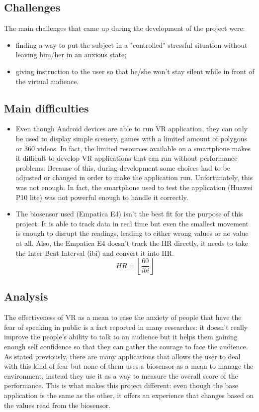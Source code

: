 \subsection{Challenges}
The main challenges that came up during the development of the project were:
\begin{itemize}
	\item finding a way to put the subject in a "controlled" stressful situation without leaving him/her in an anxious state;
	\item giving instruction to the user so that he/she won't stay silent while in front of the virtual audience.
\end{itemize}


\subsection{Main difficulties}
\begin{itemize}
	\item Even though Android devices are able to run VR application, they can only be used to display simple scenery, games with a limited amount of polygons or 360\textdegree{} videos. In fact, the limited resources available on a smartphone makes it difficult to develop VR applications that can run without performance problems. Because of this, during development some choices had to be adjusted or changed in order to make the application run. Unfortunately, this was not enough. In fact, the smartphone used to test the application (Huawei P10 lite) was not powerful enough to handle it correctly.\\
	\item The biosensor used (Empatica E4) isn't the best fit for the purpose of this project. It is able to track data in real time but even the smallest movement is enough to disrupt the readings, leading to either wrong values or no value at all. Also, the Empatica E4 doesn't track the HR directly, it needs to take the Inter-Beat Interval (ibi) and convert it into HR.
	\begin{equation}
		HR = \left \lfloor \frac{60}{ibi} \right \rfloor
	\end{equation}
\end{itemize}

\subsection{Analysis}
The effectiveness of VR as a mean to ease the anxiety of people that have the fear of speaking in public is a fact reported in many researches: it doesn't really improve the people's ability to talk to an audience but it helps them gaining enough self confidence so that they can gather the courage to face the audience.\\
As stated previously, there are many applications that allows the user to deal with this kind of fear but none of them uses a biosensor as a mean to manage the environment, instead they use it as a way to measure the overall score of the performance. This is what makes this project different: even though the base application is the same as the other, it offers an experience that changes based on the values read from the biosensor.